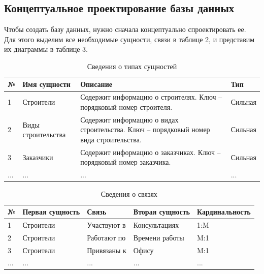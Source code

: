 \documentclass{../SIBGU-state}
\begin{document}
\subsection{Концептуальное проектирование базы данных}
Чтобы создать базу данных, нужно сначала концептуально спроектировать ее. Для этого выделим все необходимые сущности, связи в таблице 2, и представим их диаграммы в таблице 3. \par
\begin{table}[htb]
	\caption{Сведения о типах сущностей}
	\centering
	\small\begin{tabular}{ |p{2cm}|p{3.5cm}|p{5.4cm}|p{4cm}| }
        \hline
		№ & Имя сущности & Описание & Тип \\ \hline
        1 & Строители & Содержит информацию о строителях. Ключ – порядковый номер строителя. & Сильная \\ \hline
        2 & Виды строительства & Содержит информацию о видах строительства. Ключ – порядковый номер вида строительства. & Сильная \\ \hline
        3 & Заказчики & Содержит информацию о заказчиках. Ключ – порядковый номер заказчика. & Сильная \\ \hline
        ... & ... & ... & ... \\ \hline
	\end{tabular}
	\label{tab:in_appendix}
\end{table}\par

\begin{table}[htb]
	\caption{Сведения о связях}
	\centering
	\small\begin{tabular}{ |p{1.6cm}|p{3.5cm}|p{3.4cm}|p{3cm}|p{3cm}| }
        \hline
		№ & Первая сущность & Связь & Вторая сущность & Кардинальность \\ \hline
        1 & Строители & Участвуют в & Консультациях & 1:M \\ \hline
        2 & Строители & Работают по & Времени работы & M:1 \\ \hline
        3 & Строители & Привязаны к & Офису & M:1 \\ \hline
        ... & ... & ... & ... & ...\\ \hline
	\end{tabular}
	\label{tab:in_appendix}
\end{table}\par
\end{document}

